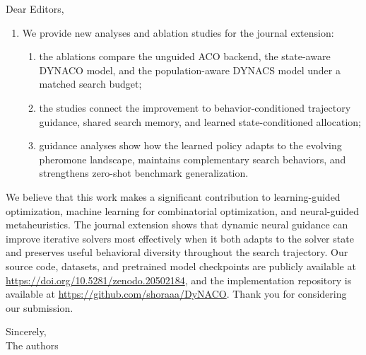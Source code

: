 \documentclass[11pt]{letter}
\begin{document}
\begin{letter}{
Dear Editors,
}
\begin{enumerate}
\item We provide new analyses and ablation studies for the journal extension:
\begin{enumerate}
    \item the ablations compare the unguided ACO backend, the state-aware DYNACO model, and the population-aware DYNACS model under a matched search budget;
    \item the studies connect the improvement to behavior-conditioned trajectory guidance, shared search memory, and learned state-conditioned allocation;
    \item guidance analyses show how the learned policy adapts to the evolving pheromone landscape, maintains complementary search behaviors, and strengthens zero-shot benchmark generalization.
\end{enumerate}


\end{enumerate}
\vspace{6pt}

We believe that this work makes a significant contribution to learning-guided optimization, machine learning for combinatorial optimization, and neural-guided metaheuristics. The journal extension shows that dynamic neural guidance can improve iterative solvers most effectively when it both adapts to the solver state and preserves useful behavioral diversity throughout the search trajectory. Our source code, datasets, and pretrained model checkpoints are publicly available at \href{https://doi.org/10.5281/zenodo.20502184}{https://doi.org/10.5281/zenodo.20502184}, and the implementation repository is available at \href{https://github.com/shoraaa/DyNACO}{https://github.com/shoraaa/DyNACO}. Thank you for considering our submission.
\vspace{6pt}

\closing{Sincerely, \\ The authors}

\end{letter}
\end{document}
